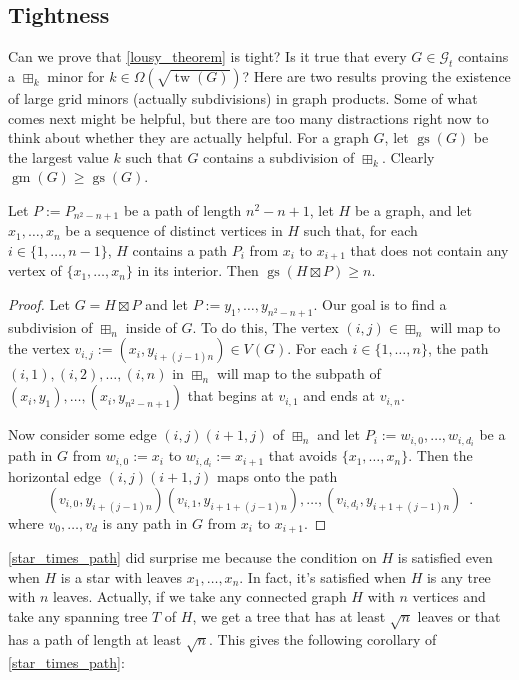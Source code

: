\documentclass{patmorin}
\DeclareMathOperator{\tw}{tw}
\DeclareMathOperator{\gm}{gm}
\DeclareMathOperator{\gs}{gs}
\begin{document}
\subsection{Tightness}

Can we prove that \cref{lousy_theorem} is tight?  Is it true that every $G\in \mathcal{G}_t$ contains a $\boxplus_k$ minor for $k\in\Omega(\sqrt{\tw(G)})$?  Here are two results proving the existence of large grid minors (actually subdivisions) in graph products.  Some of what comes next might be helpful, but there are too many distractions right now to think about whether they are actually helpful.  For a graph $G$, let $\gs(G)$ be the largest value $k$ such that $G$ contains a subdivision of $\boxplus_k$.  Clearly $\gm(G)\ge\gs(G)$.


\begin{lem}\label{star_times_path}
    Let $P:=P_{n^2-n+1}$ be a path of length $n^2-n+1$, let $H$ be a graph, and let $x_1,\ldots,x_n$ be a sequence of distinct vertices in $H$ such that, for each $i\in\{1,\ldots,n-1\}$, $H$ contains a path $P_{i}$ from $x_i$ to $x_{i+1}$ that does not contain any vertex of $\{x_1,\ldots,x_n\}$ in its interior.  Then $\gs(H\boxtimes P)\ge n$.
\end{lem}

\begin{proof}
    Let $G=H\boxtimes P$ and let $P:=y_1,\ldots,y_{n^2-n+1}$.  Our goal is to find a subdivision of $\boxplus_n$ inside of $G$.  To do this, The vertex $(i,j)\in\boxplus_n$ will map to the vertex $v_{i,j}:=(x_i,y_{i+(j-1)n})\in V(G)$.  For each $i\in\{1,\ldots,n\}$, the path $(i,1),(i,2),\ldots,(i,n)$ in $\boxplus_n$ will map to the subpath of $(x_i,y_1),\ldots,(x_i,y_{n^2-n+1})$ that begins at $v_{i,1}$ and ends at $v_{i,n}$.

    Now consider some edge $(i,j)(i+1,j)$ of $\boxplus_n$ and let $P_i:=w_{i,0},\ldots,w_{i,d_i}$ be a path in $G$ from $w_{i,0}:=x_i$ to $w_{i,d_i}:=x_{i+1}$ that avoids $\{x_1,\ldots,x_n\}$.  Then the horizontal edge $(i,j)(i+1,j)$ maps onto the path
    \[
        (v_{i,0},y_{i+(j-1)n})(v_{i,1},y_{i+1+(j-1)n}),\ldots,(v_{i,d_i},y_{i+1+(j-1)n}) \enspace .
    \]
    where $v_0,\ldots,v_d$ is any path in $G$ from $x_{i}$ to $x_{i+1}$.
\end{proof}

\cref{star_times_path} did surprise me  because the condition on $H$ is satisfied even when $H$ is a star with leaves $x_1,\ldots,x_n$.  In fact, it's satisfied when $H$ is any tree with $n$ leaves.  Actually, if we take any connected graph $H$ with $n$ vertices and take any spanning tree $T$ of $H$, we get a tree that has at least $\sqrt{n}$ leaves or that has a path of length at least $\sqrt{n}$.  This gives the following corollary of \cref{star_times_path}:
\end{document}
